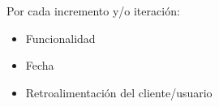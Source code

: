 Por cada incremento y/o iteración:
\begin{itemize}
    \item Funcionalidad
    \item Fecha
    \item Retroalimentación del cliente/usuario
\end{itemize}